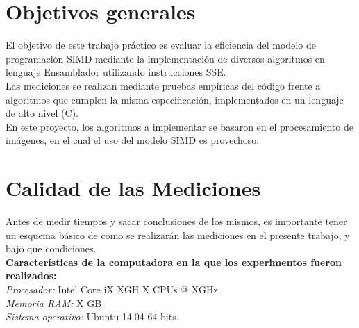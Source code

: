 \documentclass[10pt,a4paper,spanish]{article}
\begin{document}


\maketitle

\newpage

\tableofcontents

\clearpage

\section{Objetivos generales}

El objetivo de este trabajo práctico es evaluar la eficiencia del modelo de programación SIMD mediante la implementación de diversos algoritmos en lenguaje Ensamblador utilizando instrucciones SSE. \\
\indent Las mediciones se realizan mediante pruebas empíricas del código frente a algoritmos que cumplen la misma especificación, implementados en un lenguaje de alto nivel (C). \\
\indent En este proyecto, los algoritmos a implementar se basaron en el procesamiento de imágenes, en el cual el uso del modelo SIMD es provechoso.

\section{Calidad de las Mediciones}
Antes de medir tiempos y sacar conclusiones de los mismos, es importante tener un esquema básico de como se realizarán las mediciones en el presente trabajo, y bajo que condiciones. \\

\textbf{Características de la computadora en la que los experimentos fueron realizados:} \\
\textit{Procesador:} Intel Core iX XGH X CPUs @ XGHz\\
\textit{Memoria RAM:} X GB \\
\textit{Sistema operativo:} Ubuntu 14.04 64 bits. \\
\end{document}
